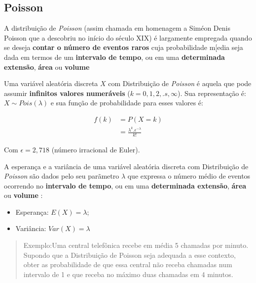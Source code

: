 \documentclass[
]{book}
\providecommand{\tightlist}{%
  \setlength{\itemsep}{0pt}\setlength{\parskip}{0pt}}
\begin{document}
\hypertarget{poisson}{%
\subsection{Poisson}\label{poisson}}

A distribuição de \emph{Poisson} (assim chamada em homenagem a Siméon Denis Poisson que a descobriu no início do século XIX) é largamente empregada quando se deseja \textbf{contar o número de eventos raros} cuja probabilidade m{[}edia seja dada em termos de um \textbf{intervalo de tempo}, ou em uma \textbf{determinada extensão}, \textbf{área} ou \textbf{volume}

\hfill\break

Uma variável aleatória discreta \(X\) com Distribuição de \emph{Poisson} é aquela que pode assumir \textbf{infinitos valores numeráveis} (\(k=0,1,2, .s, \infty\)). Sua representação é: \(X \sim Pois (\lambda)\) e sua função de probabilidade para esses valores é:

\hfill\break

\begin{align*}
f(k) & = P(X=k) \\
     & = \frac{\lambda^{k}. \epsilon^{-\lambda}} {k!} 
\end{align*}

Com \(\epsilon= 2,718\) (número irracional de Euler).

\hfill\break

A esperança e a variância de uma variável aleatória discreta com Distribuição de \emph{Poisson} são dados pelo seu parãmetro \(\lambda\) que expressa o número médio de eventos ocorrendo no \textbf{intervalo de tempo}, ou em uma \textbf{determinada extensão}, \textbf{área} ou \textbf{volume} :

\begin{itemize}
\tightlist
\item
  Esperança: \(E(X) = \lambda\);\\
\item
  Variância: \(Var(X) = \lambda\)
\end{itemize}

\hfill\break

\begin{quote}
Exemplo:Uma central telefônica recebe em média 5 chamadas por minuto. Supondo que a Distribuição de Poisson seja adequada a esse contexto, obter as probabilidade de que essa central não receba chamadas num intervalo de 1 e que receba no máximo duas chamadas em 4 minutos.
\end{quote}
\end{document}
